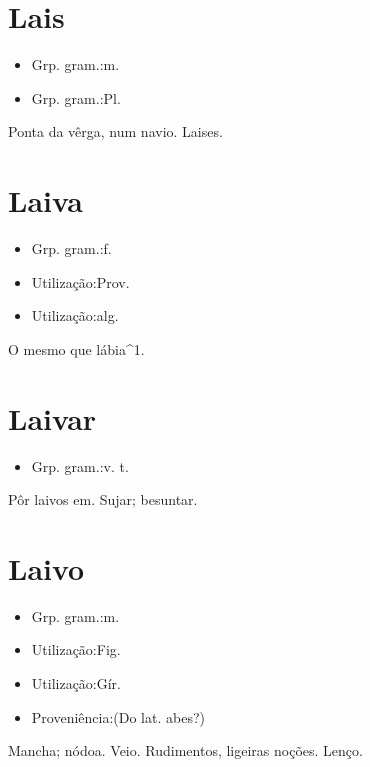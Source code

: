 \section{Lais}
\begin{itemize}
\item {Grp. gram.:m.}
\end{itemize}
\begin{itemize}
\item {Grp. gram.:Pl.}
\end{itemize}
Ponta da vêrga, num navio.
Laises.
\section{Laiva}
\begin{itemize}
\item {Grp. gram.:f.}
\end{itemize}
\begin{itemize}
\item {Utilização:Prov.}
\end{itemize}
\begin{itemize}
\item {Utilização:alg.}
\end{itemize}
O mesmo que \textunderscore lábia\textunderscore ^1.
\section{Laivar}
\begin{itemize}
\item {Grp. gram.:v. t.}
\end{itemize}
Pôr laivos em.
Sujar; besuntar.
\section{Laivo}
\begin{itemize}
\item {Grp. gram.:m.}
\end{itemize}
\begin{itemize}
\item {Utilização:Fig.}
\end{itemize}
\begin{itemize}
\item {Utilização:Gír.}
\end{itemize}
\begin{itemize}
\item {Proveniência:(Do lat. \textunderscore abes\textunderscore ?)}
\end{itemize}
Mancha; nódoa.
Veio.
Rudimentos, ligeiras noções.
Lenço.
